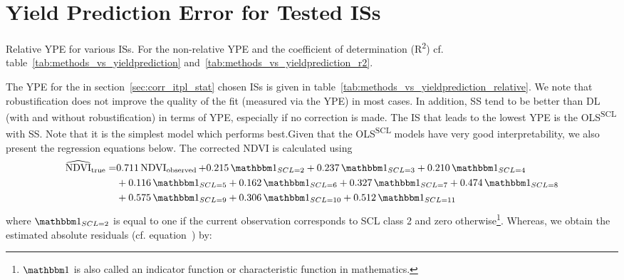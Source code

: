 \section{Yield Prediction Error for Tested ISs} \label{sec:results_ndvi_corr}
	\begin{table}
		\begin{center}
			\caption[Relative Yield Estimation Error for ISs]{Relative YPE for various ISs. For the non-relative YPE and the coefficient of determination (R\textsuperscript{2}) cf. table~\ref{tab:methods_vs_yieldprediction} and~\ref{tab:methods_vs_yieldprediction_r2}.}
			\small
			
			\label{tab:methods_vs_yieldprediction_relative}
			\normalsize
		\end{center}
	\end{table}
	The YPE for the in section~\ref{sec:corr_itpl_stat} chosen {{IS}}s is given in table~\ref{tab:methods_vs_yieldprediction_relative}. We note that robustification does not improve the quality of the fit (measured via the YPE) in most cases. 
	In addition, SS tend to be better than DL (with and without robustification) in terms of YPE, especially if no correction is made. The {{IS}} that leads to the lowest YPE is the OLS\textsuperscript{SCL} with SS. Note that it is the simplest model which performs best.Given that the OLS\textsuperscript{SCL} models have very good interpretability, we also present the regression equations below. The corrected NDVI is calculated using 
	\begin{equation}\label{eq:corr_lm}
		\begin{aligned}		
			{\widehat{\operatorname{NDVI}}}_{\text{true}}  = &
			0.711 \operatorname{NDVI}_\text{observed}  
			+ 0.215 \,\mathbbm 1_{{SCL = 2}} 
			+ 0.237 \,\mathbbm 1_{{SCL = 3}} 
			+ 0.210 \,\mathbbm 1_{{SCL = 4}} \\ &
			+ 0.116 \,\mathbbm 1_{{SCL = 5}} 
			+ 0.162 \,\mathbbm 1_{{SCL = 6}} 
			+ 0.327 \,\mathbbm 1_{{SCL = 7}} 
			+ 0.474 \,\mathbbm 1_{{SCL = 8}} \\ &
			+ 0.575 \,\mathbbm 1_{{SCL = 9}} 
			+ 0.306 \,\mathbbm 1_{{SCL = 10}} 
			+ 0.512 \,\mathbbm 1_{{SCL = 11}} 
		\end{aligned}
	\end{equation} 
	where $\mathbbm 1_{{SCL = 2}}$ is equal to one if the current observation corresponds to SCL class 2 and zero otherwise\footnote{$\mathbbm 1$ is also called an indicator function or characteristic function in mathematics.}. Whereas, we obtain the estimated absolute residuals (cf. equation~) by: 
